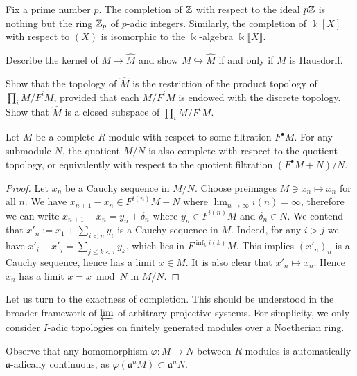 \begin{example}
	Fix a prime number $p$. The completion of $\mathbb{Z}$ with respect to the ideal $p\mathbb{Z}$ is nothing but the ring $\mathbb{Z}_p$ of $p$-adic integers. Similarly, the completion of $\Bbbk[X]$ with respect to $(X)$ is isomorphic to the $\Bbbk$-algebra $\Bbbk\llbracket X\rrbracket$.
\end{example}

\begin{exercise}
	Describe the kernel of $M \to \hat{M}$ and show $M \hookrightarrow \hat{M}$ if and only if $M$ is Hausdorff.
\end{exercise}

\begin{exercise}
	Show that the topology of $\hat{M}$ is the restriction of the product topology of $\prod_i M/F^i M$, provided that each $M/F^i M$ is endowed with the discrete topology. Show that $\hat{M}$ is a closed subspace of $\prod_i M/F^i M$.
\end{exercise}

\begin{lemma}\label{prop:quotient-completion}
	Let $M$ be a complete $R$-module with respect to some filtration $F^\bullet M$. For any submodule $N$, the quotient $M/N$ is also complete with respect to the quotient topology, or equivalently with respect to the quotient filtration $(F^\bullet M + N)/N$.
\end{lemma}
\begin{proof}
	Let $\bar{x}_n$ be a Cauchy sequence in $M/N$. Choose preimages $M \ni x_n \mapsto \bar{x}_n$ for all $n$. We have $\bar{x}_{n+1} - \bar{x}_n \in F^{i(n)}M + N$ where $\lim_{n \to \infty} i(n) = \infty$, therefore we can write $x_{n+1} - x_n = y_n + \delta_n$ where $y_n \in F^{i(n)} M$ and $\delta_n \in N$. We contend that $x'_n := x_1 + \sum_{i < n} y_i$ is a Cauchy sequence in $M$. Indeed, for any $i > j$ we have $x'_i - x'_j = \sum_{j \leq k < i} y_k$, which lies in $F^{\inf_k i(k)} M$. This implies $(x'_n)_n$ is a Cauchy sequence, hence has a limit $x \in M$. It is also clear that $x'_n \mapsto \bar{x}_n$. Hence $\bar{x}_n$ has a limit $\bar{x} = x \bmod N$ in $M/N$.
\end{proof}

Let us turn to the exactness of completion. This should be understood in the broader framework of $\varprojlim$ of arbitrary projective systems. For simplicity, we only consider $I$-adic topologies on finitely generated modules over a Noetherian ring.

Observe that any homomorphism $\varphi: M \to N$ between $R$-modules is automatically $\mathfrak{a}$-adically continuous, as $\varphi(\mathfrak{a}^n M) \subset \mathfrak{a}^n N$.

